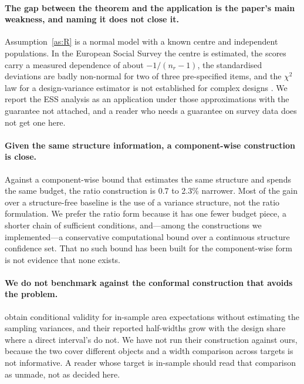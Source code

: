 \paragraph{The gap between the theorem and the application is the paper's main
weakness, and naming it does not close it.} Assumption~\ref{as:R} is a normal
model with a known centre and independent populations. In the European Social
Survey the centre is estimated, the scores carry a measured dependence of about
$-1/(n_r-1)$, the standardised deviations are badly non-normal for two of three
pre-specified items, and the $\chi^2$ law for a design-variance estimator is not
established for complex designs \citep{mcgovern2026}. We report the ESS analysis
as an application under those approximations with the guarantee not attached, and
a reader who needs a guarantee on survey data does not get one here.

\paragraph{Given the same structure information, a component-wise construction is
close.} Against a component-wise bound that estimates the same structure and
spends the same budget, the ratio construction is 0.7 to 2.3\% narrower. Most of
the gain over a structure-free baseline is the use of a variance structure, not
the ratio formulation. We prefer the ratio form because it has one fewer budget
piece, a shorter chain of sufficient conditions, and---among the constructions we
implemented---a conservative computational bound over a continuous structure
confidence set. That no such bound has been built for the component-wise form is
not evidence that none exists.

\paragraph{We do not benchmark against the conformal construction that avoids
the problem.} \citet{zhang2026conformal} obtain conditional validity for
in-sample area expectations without estimating the sampling variances, and their
reported half-widths grow with the design share where a direct interval's do not.
We have not run their construction against ours, because the two cover different
objects and a width comparison across targets is not informative. A reader whose
target is in-sample should read that comparison as unmade, not as decided here.

